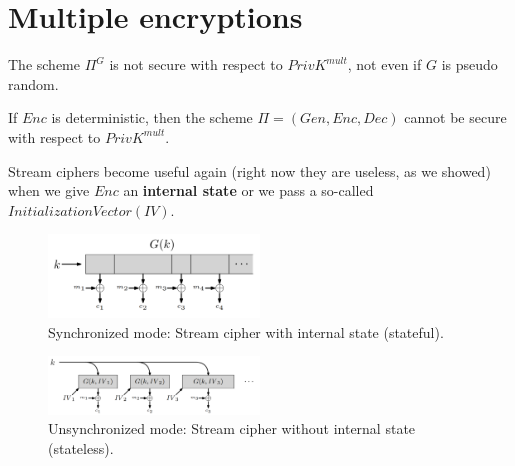 \documentclass[../main]{subfiles}
\begin{document}
\section{Multiple encryptions}
\begin{lemma}
    The scheme $\Pi^G$ is not secure with respect to $PrivK^{mult}$, not even if $G$ is pseudo random.
\end{lemma}
\begin{theorem}
    If $Enc$ is deterministic, then the scheme $\Pi = (Gen, Enc, Dec)$ cannot be secure with respect to $PrivK^{mult}$.
\end{theorem}
Stream ciphers become useful again (right now they are useless, as we showed) when we give $Enc$ an \textbf{internal state} or we pass a so-called $Initialization Vector (IV)$.
\begin{figure}[h]
    \centering
    \includegraphics[width=0.5\textwidth]{images/synchronized_mode}
    \caption{Synchronized mode: Stream cipher with internal state (stateful).}
\end{figure}
\begin{figure}[h]
    \centering
    \includegraphics[width=0.5\textwidth]{images/unsynchronized_mode}
    \caption{Unsynchronized mode: Stream cipher without internal state (stateless).}
\end{figure}
\end{document}
